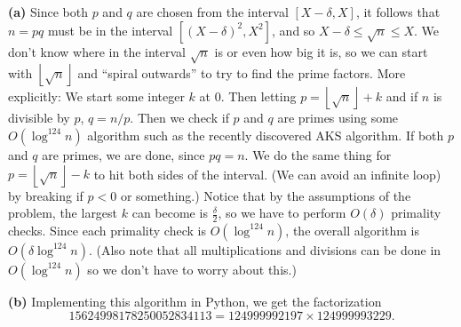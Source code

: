 \documentclass[11pt,letterpaper]{article}
\begin{document}
\begin{solution}
    \textbf{(a)} Since both $p$ and $q$ are chosen from the interval $[X-\delta, X]$, it follows that $n=pq$ must be in the interval $[(X-\delta)^2, X^2]$, and so $X-\delta \leq \sqrt{n}\leq X$. We don't know where in the interval $\sqrt{n}$ is or even how big it is, so we can start with $\left\lfloor \sqrt{n} \right\rfloor$ and ``spiral outwards'' to try to find the prime factors. More explicitly: We start some integer $k$ at $0$. Then letting $p=\left\lfloor \sqrt{n} \right\rfloor+k$ and if $n$ is divisible by $p$, $q=n /p$. Then we check if $p$ and $q$ are primes using some $O(\log^{124} n)$ algorithm such as the recently discovered AKS algorithm. If both $p$ and $q$ are primes, we are done, since $pq=n$. We do the same thing for $p=\left\lfloor \sqrt{n} \right\rfloor-k$ to hit both sides of the interval. (We can avoid an infinite loop) by breaking if $p<0$ or something.) Notice that by the assumptions of the problem, the largest $k$ can become is $\frac{\delta}{2}$, so we have to perform $O(\delta)$ primality checks. Since each primality check is $O(\log^{124} n)$, the overall algorithm is $O(\delta\log^{124}n)$. (Also note that all multiplications and divisions can be done in $O(\log^{124} n)$ so we don't have to worry about this.) 
    
    \textbf{(b)} Implementing this algorithm in Python, we get the factorization
    \[
        15624998178250052834113 = 124999992197 \times 124999993229
    .\]   
\end{solution}
\end{document}
